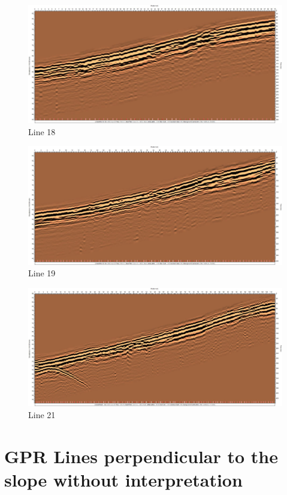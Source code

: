 \begin{figure}[H]
    \centering
    \includegraphics[width=\linewidth]{Images/00_Results/line18.jpg}
    \caption{Line 18}
    \label{fig:line18_}
\end{figure}

\begin{figure}[H]
    \centering
    \includegraphics[width=\linewidth]{Images/00_Results/line19.jpg}
    \caption{Line 19}
    \label{fig:line19_}
\end{figure}

\begin{figure}[H]
    \centering
    \includegraphics[width=\linewidth]{Images/00_Results/line21.jpg}
    \caption{Line 21}
    \label{fig:line21_}
\end{figure}

\section{GPR Lines perpendicular to the slope without interpretation}